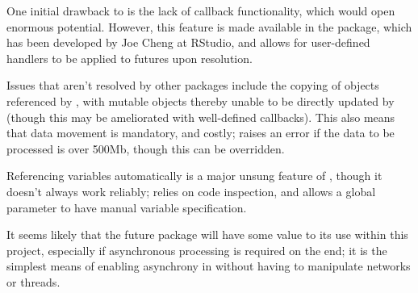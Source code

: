 One initial drawback to  is the lack of callback functionality, which would open enormous potential.
However, this feature is made available in the  package, which has been developed by Joe Cheng at RStudio, and allows for user-defined handlers to be applied to futures upon resolution\cite{cheng2021promises}.

Issues that aren't resolved by other packages include the copying of objects referenced by , with mutable objects thereby unable to be directly updated by  (though this may be ameliorated with well-defined callbacks).
This also means that data movement is mandatory, and costly;  raises an error if the data to be processed is over 500Mb, though this can be overridden.

Referencing variables automatically is a major unsung feature of , though it doesn't always work reliably;  relies on code inspection, and allows a global parameter to have manual variable specification.

It seems likely that the future package will have some value to its use within this project, especially if asynchronous processing is required on the \R{} end; it is the simplest means of enabling asynchrony in \R{} without having to manipulate networks or threads.
